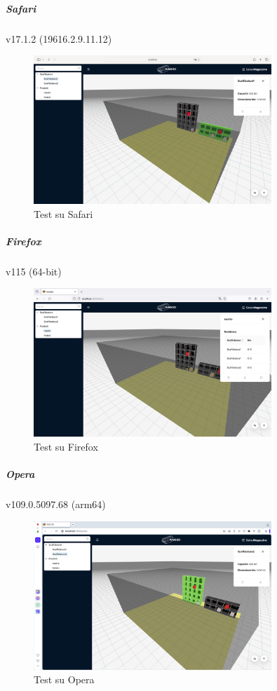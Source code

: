 \subparagraph{Safari}
v17.1.2 (19616.2.9.11.12)
\begin{figure}[H] 
    \centering
    \includegraphics[width=0.8\textwidth]{images/safari.png}
    \caption{Test su Safari}
\end{figure}


\subparagraph{Firefox}
v115 (64-bit)
\begin{figure}[H] 
    \centering
    \includegraphics[width=0.8\textwidth]{images/firefox.png}
    \caption{Test su Firefox}
\end{figure}

\subparagraph{Opera}
v109.0.5097.68 (arm64)
\begin{figure}[H] 
    \centering
    \includegraphics[width=0.8\textwidth]{images/opera.png}
    \caption{Test su Opera}
\end{figure}


